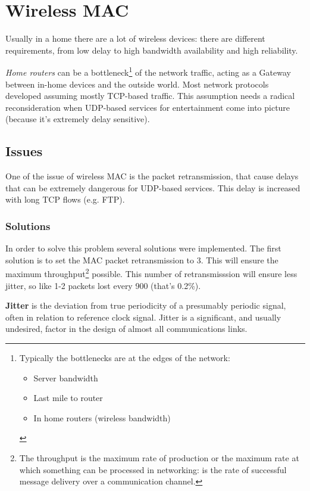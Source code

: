 \chapter{Wireless MAC}


Usually in a home there are a lot of wireless devices: there are different
requirements, from low delay to high bandwidth availability and high reliability.

\textit{Home routers} can be a bottleneck\footnote{
  Typically the bottlenecks are at the edges of the network:
  \begin{itemize}
  \item Server bandwidth
  \item Last mile to router
  \item In home routers (wireless bandwidth)
  \end{itemize}
}
of the network traffic, acting as a Gateway between in-home devices and the
outside world.
Most network protocols developed assuming mostly TCP-based traffic. This
assumption needs a radical reconsideration when UDP-based services for
entertainment come into picture (because it's extremely delay sensitive).

\section{Issues}

One of the issue of wireless MAC is the packet retransmission, that cause delays
that can be extremely dangerous for UDP-based services. This delay is increased
with long TCP flows (e.g. FTP).

\subsection{Solutions}

In order to solve this problem several solutions were implemented. The first
solution is to set the MAC packet retransmission to 3. This will ensure the
maximum throughput\footnote{
  The throughput is the maximum rate of production or the maximum rate at which
  something can be processed in networking: is the rate of successful message
  delivery over a communication channel.
}
possible. This number of retransmisssion will ensure less jitter, so like 1-2
packets lost every 900 (that's 0.2\%).

\textbf{Jitter} is the deviation from true periodicity of a presumably
periodic signal, often in relation to reference clock signal. Jitter is a
significant, and usually undesired, factor in the design of almost all
communications links.

